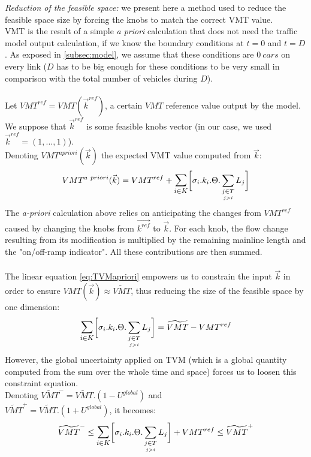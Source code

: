 \emph{Reduction of the feasible space:} we present here a method used to reduce the feasible space size by forcing the knobs to match the correct VMT value.\\
VMT is the result of a simple \emph{a priori} calculation that does not need the traffic model output calculation, if we know the boundary conditions at $t=0$ and $t=D$. As exposed in \ref{subsec:model}, we assume that these conditions are $0\ cars$ on every link ($D$ has to be big enough for these conditions to be very small in comparison with the total number of vehicles during $D$).\\
\\
Let $VMT^{ref}=VMT(\vec{k}^{ref})$, a certain $VMT$ reference value output by the model. We suppose that $\vec{k}^{ref}$ is some feasible knobs vector (in our case, we used $\vec{k}^{ref}=(1,...,1)$).\\
Denoting $VMT^{a priori}(\vec{k})$ the expected VMT value computed from $\vec{k}$:\\
\begin{equation}
	\label{eq:TVMapriori}
	VMT^{a\ priori}(\vec{k})=VMT^{ref}+\mathlarger{\sum\limits_{i\in K}}\biggl[\sigma_{i}.k_{i}.\Theta.	\sum\limits_{\underset{j>i}{j\in T}}L_{j}\biggr]
\end{equation}	
The \emph{a-priori} calculation above relies on anticipating the changes from $VMT^{ref}$ caused by changing the knobs from $\vec{k^{ref}}$ to $\vec{k}$. For each knob, the flow change resulting from its modification is multiplied by the remaining mainline length and the "on/off-ramp indicator". All these contributions are then summed.\\
\\
The linear equation \ref{eq:TVMapriori} empowers us to constrain the input $\vec{k}$ in order to ensure $VMT(\vec{k})\approx \widetilde{VMT}$, thus reducing the size of the feasible space by one dimension:
\begin{equation*}
	\mathlarger{\sum\limits_{i\in K}}\biggl[\sigma_{i}.k_{i}.\Theta.	\sum\limits_{\underset{j>i}{j\in T}}L_{j}\biggr]=\widetilde{VMT}-VMT^{ref}
\end{equation*}
However, the global uncertainty applied on TVM (which is a global quantity computed from the sum over the whole time and space) forces us to loosen this constraint equation.\\
Denoting $\widetilde{VMT}^{-}=\widetilde{VMT}.(1-U^{global})$ and\\ $\widetilde{VMT}^{+}=\widetilde{VMT}.(1+U^{global})$, it becomes:\\
\begin{equation}	
	\label{eq:TVMineq}
	\widetilde{VMT}^{-}\leq\mathlarger{\sum\limits_{i\in K}}\biggl[\sigma_{i}.k_{i}.\Theta.	\sum\limits_{\underset{j>i}{j\in T}}L_{j}\biggr]+VMT^{ref}\leq \widetilde{VMT}^{+}
\end{equation} 